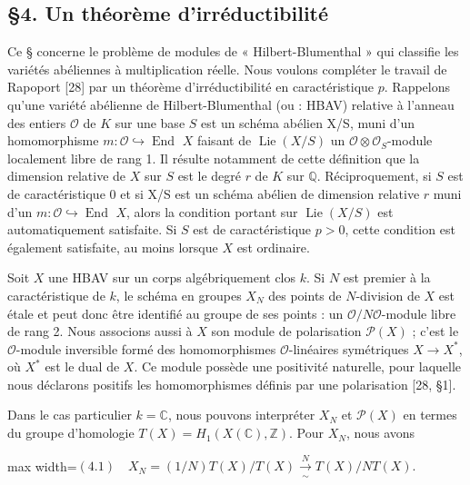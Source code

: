 \documentclass[11pt]{article}
\newcommand{\DFormula}[1]{\par\smallskip\noindent\begin{adjustbox}{max width=\linewidth}$\displaystyle #1$\end{adjustbox}\par\smallskip}
\begin{document}
\subsection*{§4. Un théorème d’irréductibilité}
\par
Ce § concerne le problème de modules de « Hilbert-Blumenthal » qui classifie les variétés abéliennes à multiplication réelle. Nous voulons compléter le travail de Rapoport [28] par un théorème d’irréductibilité en caractéristique \(p\). Rappelons qu’une variété abélienne de Hilbert-Blumenthal (ou : HBAV) relative à l’anneau des entiers \(\mathcal{O}\) de \(K\) sur une base \(S\) est un schéma abélien X/S, muni d’un homomorphisme \(m:\mathcal{O}\hookrightarrow \operatorname{End}\) \(X\) faisant de \(\operatorname{Lie}(X/S)\) un \(\mathcal{O}\otimes \mathcal{O}_{S}\)-module localement libre de rang 1. Il résulte notamment de cette définition que la dimension relative de \(X\) sur \(S\) est le degré \(r\) de \(K\) sur \(\mathbb{Q}\). Réciproquement, si \(S\) est de caractéristique 0 et si X/S est un schéma abélien de dimension relative \(r\) muni d’un \(m:\mathcal{O}\hookrightarrow \operatorname{End}\) \(X\), alors la condition portant sur \(\operatorname{Lie}(X/S)\) est automatiquement satisfaite. Si \(S\) est de caractéristique \(p>0\), cette condition est également satisfaite, au moins lorsque \(X\) est ordinaire.\par
\par
Soit \(X\) une HBAV sur un corps algébriquement clos \(k\). Si \(N\) est premier à la caractéristique de \(k\), le schéma en groupes \(X_{N}\) des points de \(N\)-division de \(X\) est étale et peut donc être identifié au groupe de ses points : un \(\mathcal{O}/N\mathcal{O}\)-module libre de rang 2. Nous associons aussi à \(X\) son module de polarisation \(\mathcal{P}(X)\) ; c’est le \(\mathcal{O}\)-module inversible formé des homomorphismes \(\mathcal{O}\)-linéaires symétriques \(X\to X^{\ast}\), où \(X^{\ast}\) est le dual de \(X\). Ce module possède une positivité naturelle, pour laquelle nous déclarons positifs les homomorphismes définis par une polarisation [28, §1].\par
\par
Dans le cas particulier \(k=\mathbb{C}\), nous pouvons interpréter \(X_{N}\) et \(\mathcal{P}(X)\) en termes du groupe d’homologie \(T(X)=H_{1}(X(\mathbb{C}),\mathbb{Z})\). Pour \(X_{N}\), nous avons\par
\par
\DFormula{(4.1)\quad X_N=(1/N)T(X)/T(X)\xrightarrow[\sim]{N}T(X)/NT(X).}
\end{document}
